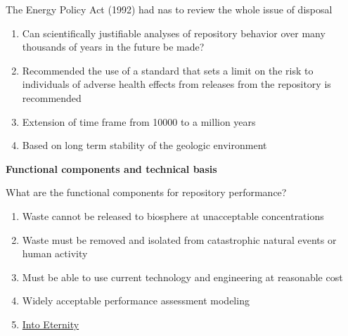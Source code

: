 \documentclass[aspectratio=1610,pdftex,dvipsnames,compress,xcolor={dvipsnames}]{beamer}
\newcommand{\acs}{\acrshort} %
\begin{document}
\begin{frame}{The Energy Policy Act (1992) had \acs{nas} to review the whole issue of disposal}
    \begin{enumerate}[series=outerlist,topsep=0pt,itemsep=21pt,leftmargin=*,label=(\arabic*)]
        \item[]Can scientifically justifiable analyses of repository behavior over many thousands of years in the future be made?
        \item[]Recommended the use of a standard that sets a limit on the risk to individuals of adverse
health effects from releases from the repository is recommended
        \item[]Extension of time frame from 10000 to a million years
        \item[]Based on long term stability of the geologic environment
    \end{enumerate}
\end{frame}


\begin{frame}[plain]{}
    \centering\LARGE\textbf{Functional components and technical basis}
\end{frame}


\addtocounter{framenumber}{-1} 
\begin{frame}{What are the functional components for repository performance?}
    \begin{enumerate}[series=outerlist,topsep=0pt,itemsep=21pt,leftmargin=*,label=(\arabic*)]
        \item[]Waste cannot be released to biosphere at unacceptable concentrations
        \item[]Waste must be removed and isolated from catastrophic natural events or human activity
        \item[]Must be able to use current technology and engineering at reasonable cost
        \item[]Widely acceptable performance assessment modeling
        \item[]\href{https://youtu.be/ayLxB9fV2y4}{Into Eternity}
    \end{enumerate}
\end{frame}
\end{document}
